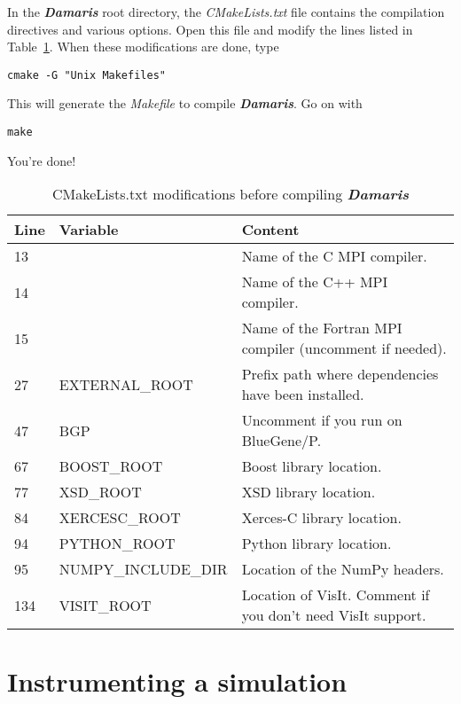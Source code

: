 \documentclass[11pt]{report}
\newcommand{\Damaris}{\emph{\textbf{Damaris}}}
\newcommand{\file}[1]{\emph{#1}}
\begin{document}
In the \Damaris{} root directory, the \file{CMakeLists.txt} file contains the compilation directives
and various options. Open this file and modify the lines listed in Table~\ref{tab:cmake}.
When these modifications are done, type
\begin{verbatim}
cmake -G "Unix Makefiles"
\end{verbatim}
This will generate the \file{Makefile} to compile \Damaris{}. Go on with 
\begin{verbatim}
make
\end{verbatim}
You're done!

\begin{table}
\centering
\begin{tabular}{|l|l|l|}
	\hline
   Line & Variable & Content \\
   \hline
   \hline
   13 &  & Name of the C MPI compiler. \\
   14 &  & Name of the C++ MPI compiler. \\
   15 &  & Name of the Fortran MPI compiler (uncomment if needed). \\
   27 & EXTERNAL\_ROOT & Prefix path where dependencies have been installed. \\
   47 & BGP & Uncomment if you run on BlueGene/P. \\
   67 & BOOST\_ROOT & Boost library location. \\
   77 & XSD\_ROOT & XSD library location. \\
   84 & XERCESC\_ROOT & Xerces-C library location. \\
   94 & PYTHON\_ROOT & Python library location. \\
   95 & NUMPY\_INCLUDE\_DIR & Location of the NumPy headers. \\
   134 & VISIT\_ROOT & Location of VisIt. Comment if you don't need VisIt support. \\
   \hline
\end{tabular}\caption{CMakeLists.txt modifications before compiling \Damaris{}}\label{tab:cmake}
\end{table}



\chapter{Instrumenting a simulation}\label{Instrumenting}
\end{document}
